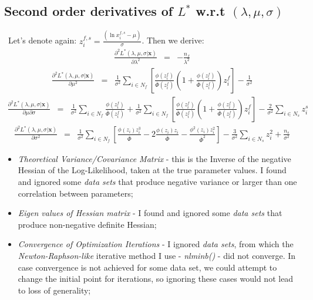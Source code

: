\documentclass{article}
\begin{document}
\subsection{Second order derivatives of $L^*$ w.r.t $\left(\lambda, \mu, \sigma \right)$}\
\indent Let's denote again: $z_i^{f,s} = \frac{\left(\ln x_i^{f,s} - \mu \right)}{\sigma}$. Then we derive: 
\begin{eqnarray}
\frac{\partial^2 L^*(\lambda, \mu, \sigma | \textbf{x}) }{\partial \lambda^2} &=& - \frac{n_f}{\lambda ^ 2} 
\end{eqnarray} 
\begin{eqnarray}
\frac{\partial^2 L^*(\lambda, \mu, \sigma | \textbf{x}) }{\partial \mu^2} &=& \frac{1}{\sigma^2}\sum_{i \in N_f} \left[ \frac{\phi \left( z_i^f \right)}{\overline \Phi \left( z_i^f \right)}\left( 1 + \frac{\phi \left( z_i^f \right)}{\overline \Phi \left( z_i^f \right)} \right) z_i^f \right] - \frac{1}{\sigma^2} 
\end{eqnarray} 
\begin{eqnarray}
\frac{\partial^2 L^*(\lambda, \mu, \sigma | \textbf{x}) }{\partial \mu \partial\sigma} &=& \frac{1}{\sigma^2} \sum_{i \in N_f} \frac{\phi \left( z_i^f \right)}{\overline \Phi \left( z_i^f \right)} + \frac{1}{\sigma^2}\sum_{i \in N_f} \left[ \frac{\phi \left( z_i^f \right)}{\overline \Phi \left( z_i^f \right)}\left( 1 + \frac{\phi \left( z_i^f \right)}{\overline \Phi \left( z_i^f \right)} \right) z_i^f \right] - \frac{2}{\sigma^2}\sum_{i \in N_s} z_i^s 
\end{eqnarray} 
\begin{eqnarray}
\frac{\partial^2 L^*(\lambda, \mu, \sigma | \textbf{x}) }{\partial \sigma^2} &=& \frac{1}{\sigma^2} \sum_{i \in N_f} \left[ \frac{\phi (z_i) z_i^3}{\overline \Phi} - 2\frac{\phi(z_i)z_i}{\overline \Phi} - \frac{\phi^2(z_i) z_i^2}{\overline\Phi ^2} \right] - \frac{3}{\sigma^2}\sum_{i \in N_s} z_i^2 + \frac{n_s}{\sigma^2}
\end{eqnarray} 
\begin{itemize}
\item \textit{Theoretical Variance/Covariance Matrix} - this is the Inverse of the negative Hessian of the Log-Likelihood, taken at the true parameter values. I found and ignored some \textit{data sets} that produce negative variance or larger than one correlation between parameters;
\item \textit{Eigen values of Hessian matrix} - I found and ignored some \textit{data sets} that produce non-negative definite Hessian;
\item \textit{Convergence of Optimization Iterations} - I ignored \textit{data sets}, from which the \textit{Newton-Raphson-like} iterative method I use - \textit{nlminb()} - did not converge. In case convergence is not achieved for some data set, we could attempt to change the initial point for iterations, so ignoring these cases would not lead to loss of generality;
\end{itemize}
\end{document}
